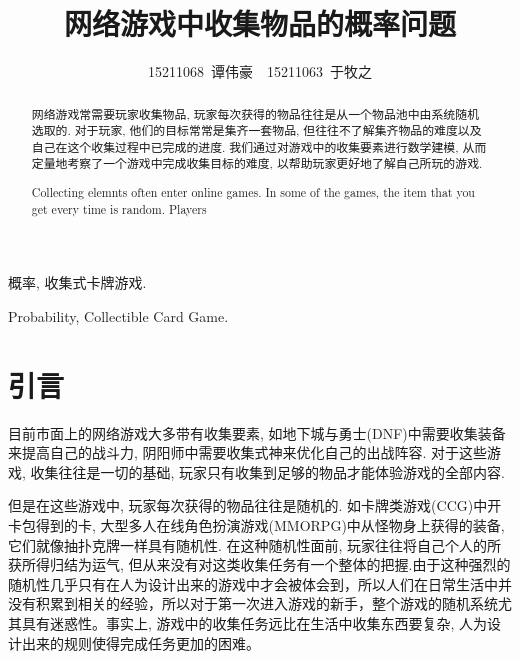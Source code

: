 \documentclass[10pt,journal,compsoc]{IEEEtran}
\begin{document}
\title{网络游戏中收集物品的概率问题}

\author{15211068~谭伟豪~~15211063~于牧之}

\maketitle

\newtheorem{definition}{Definition}
\renewcommand{\abstractname}{摘 要}
\renewcommand{\figurename}{图}
\renewcommand{\tablename}{表}
\renewcommand{\IEEEkeywordsname}{关键词}
\begin{abstract}

  网络游戏常需要玩家收集物品, 玩家每次获得的物品往往是从一个物品池中由系统随机选取的. 对于玩家, 他们的目标常常是集齐一套物品, 但往往不了解集齐物品的难度以及自己在这个收集过程中已完成的进度. 我们通过对游戏中的收集要素进行数学建模, 从而定量地考察了一个游戏中完成收集目标的难度, 以帮助玩家更好地了解自己所玩的游戏.

\end{abstract}
\renewcommand{\abstractname}{Abstract}
\begin{abstract}
  Collecting elemnts often enter online games. In some of the games, the item that you get every time is random. Players 
\end{abstract}

\begin{IEEEkeywords}
概率, 收集式卡牌游戏.
\end{IEEEkeywords}
\renewcommand{\IEEEkeywordsname}{Keywords}
\begin{IEEEkeywords}
Probability, Collectible Card Game.
\end{IEEEkeywords}

\section{引言}

  目前市面上的网络游戏大多带有收集要素, 如地下城与勇士(DNF)中需要收集装备来提高自己的战斗力, 阴阳师中需要收集式神来优化自己的出战阵容. 对于这些游戏, 收集往往是一切的基础, 玩家只有收集到足够的物品才能体验游戏的全部内容.

  但是在这些游戏中, 玩家每次获得的物品往往是随机的. 如卡牌类游戏(CCG)中开卡包得到的卡, 大型多人在线角色扮演游戏(MMORPG)中从怪物身上获得的装备, 它们就像抽扑克牌一样具有随机性. 在这种随机性面前, 玩家往往将自己个人的所获所得归结为运气, 但从来没有对这类收集任务有一个整体的把握.由于这种强烈的随机性几乎只有在人为设计出来的游戏中才会被体会到，所以人们在日常生活中并没有积累到相关的经验，所以对于第一次进入游戏的新手，整个游戏的随机系统尤其具有迷惑性。事实上, 游戏中的收集任务远比在生活中收集东西要复杂, 人为设计出来的规则使得完成任务更加的困难。
\end{document}
